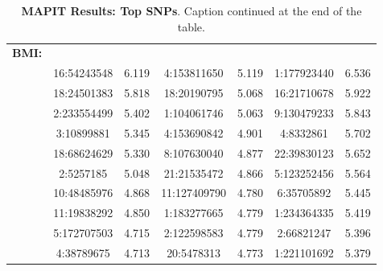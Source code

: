 \documentclass[12pt, a4paper]{article}
\begin{document}
\begin{landscape}
\begin{table}[ht]
\begin{tabular}{ccccccc}
\textbf{BMI:} & & & & & & \\
& 16:54243548 & 6.119 & 4:153811650 & 5.119 & 1:177923440 & 6.536 \\ 
  & 18:24501383 & 5.818 & 18:20190795 & 5.068 & 16:21710678 & 5.922 \\ 
  & 2:233554499 & 5.402 & 1:104061746 & 5.063 & 9:130479233 & 5.843 \\ 
  & 3:10899881 & 5.345 & 4:153690842 & 4.901 & 4:8332861 & 5.702 \\ 
  & 18:68624629 & 5.330 & 8:107630040 & 4.877 & 22:39830123 & 5.652 \\ 
  & 2:5257185 & 5.048 & 21:21535472 & 4.866 & 5:123252456 & 5.564 \\ 
  & 10:48485976 & 4.868 & 11:127409790 & 4.780 & 6:35705892 & 5.445 \\ 
  & 11:19838292 & 4.850 & 1:183277665 & 4.779 & 1:234364335 & 5.419 \\ 
  & 5:172707503 & 4.715 & 2:122598583 & 4.779 & 2:66821247 & 5.396 \\ 
  & 4:38789675 & 4.713 & 20:5478313 & 4.773 & 1:221101692 & 5.379 \\ 
   \hline
\end{tabular}
\caption[TBD]{\textbf{MAPIT Results: Top SNPs}. Caption continued at the end of the table.}
\label{InterPath-Supp-Table-MAPIT-TopSNPs-a}
\end{table}
\end{landscape}
\clearpage
\setlength{\footskip}{1cm}
\addtocounter{table}{-1}
\end{document}
